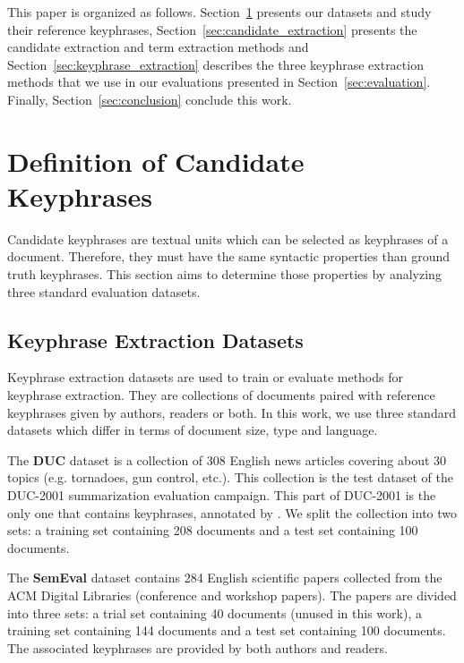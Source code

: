   This paper is organized as follows.
  Section~\ref{sec:definition_of_candidate_keyphrases} presents our datasets and
  study their reference keyphrases, Section~\ref{sec:candidate_extraction}
  presents the candidate extraction and term extraction methods and
  Section~\ref{sec:keyphrase_extraction} describes the three keyphrase
  extraction methods that we use in our evaluations presented in
  Section~\ref{sec:evaluation}. Finally,
  Section~\ref{sec:conclusion} conclude this work.

\section{Definition of Candidate Keyphrases}
\label{sec:definition_of_candidate_keyphrases}
  Candidate keyphrases are textual units which can be selected as keyphrases
  of a document. Therefore, they must have the same syntactic properties than
  ground truth keyphrases. This section aims to determine those properties by
  analyzing three standard evaluation datasets.

  \subsection{Keyphrase Extraction Datasets}
  \label{subsec:keyphrase_extraction_datasets}
    Keyphrase extraction datasets are used to train or evaluate methods for
    keyphrase extraction. They are collections of documents paired with
    reference keyphrases given by authors, readers or both. In this work, we use
    three standard datasets which differ in terms of document size,  type and
    language.

    The \textbf{DUC} dataset \cite{over2001duc} is a collection of 308 English
    news articles covering about 30 topics (e.g. tornadoes, gun control, etc.).
    This collection is the test dataset of the DUC-2001 summarization evaluation
    campaign. This part of DUC-2001 is the only one that contains keyphrases,
    annotated by . We split the collection into two
    sets: a training set containing 208 documents and a test set containing 100
    documents.

    The \textbf{SemEval} dataset \cite{kim2010semeval} contains 284 English
    scientific papers collected from the ACM Digital Libraries (conference and
    workshop papers). The papers are divided into three sets: a trial set
    containing 40 documents (unused in this work), a training set containing 144
    documents and a test set containing 100 documents. The associated keyphrases
    are provided by both authors and readers.

